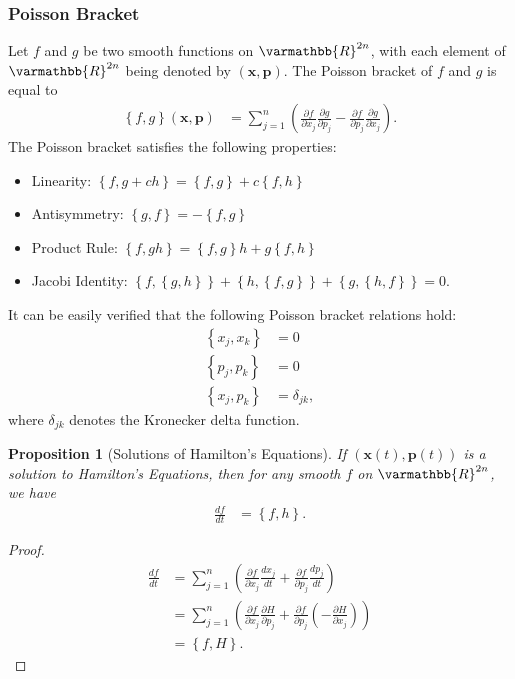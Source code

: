 \documentclass[12pt]{extarticle}
\newcommand{\R}{\varmathbb{R}}
\newcommand{\set}[1]{\left\{#1\right\}}
\theoremstyle{plain}
\newtheorem*{proposition}{Proposition}%
\theoremstyle{definition}
\theoremstyle{remark}
\begin{document}
  \subsubsection{Poisson Bracket}%
  Let $f$ and $g$ be two smooth functions on $\R^{2n}$, with each element of $\R^{2n}$ being denoted by $(\mathbf{x},\mathbf{p})$. The Poisson bracket of $f$ and $g$ is equal to
  \begin{align*}
    \set{f,g} (\mathbf{x},\mathbf{p}) &= \sum_{j=1}^{n}\left(\frac{\partial f}{\partial x_j}\frac{\partial g}{\partial p_j} - \frac{\partial f}{\partial p_j}\frac{\partial g}{\partial x_j}\right).
  \end{align*}
  The Poisson bracket satisfies the following properties:
  \begin{itemize}
    \item Linearity: $\set{f,g+ch} = \set{f,g} + c\set{f,h}$
    \item Antisymmetry: $\set{g,f} = -\set{f,g}$
    \item Product Rule: $\set{f,gh} = \set{f,g}h + g\set{f,h}$
    \item Jacobi Identity: $\set{f,\set{g,h}} + \set{h,\set{f,g}} + \set{g,\set{h,f}} = 0$.
  \end{itemize}
  It can be easily verified that the following Poisson bracket relations hold:
  \begin{align*}
    \set{x_j,x_k} &= 0\\
    \set{p_j,p_k} &= 0\\
    \set{x_j,p_k} &= \delta_{jk},
  \end{align*}
  where $\delta_{jk}$ denotes the Kronecker delta function.
  \begin{proposition}[Solutions of Hamilton's Equations]
    If $(\mathbf{x}(t),\mathbf{p}(t))$ is a solution to Hamilton's Equations, then for any smooth $f$ on $\R^{2n}$, we have
    \begin{align*}
      \frac{df}{dt} &= \set{f,h}.
    \end{align*}
  \end{proposition}
  \begin{proof}
    \begin{align*}
      \frac{df}{dt} &= \sum_{j=1}^{n}\left(\frac{\partial f}{\partial x_j}\frac{dx_j}{dt} + \frac{\partial f}{\partial p_j}\frac{dp_j}{dt}\right) \\
                    &= \sum_{j=1}^{n}\left(\frac{\partial f}{\partial x_j}\frac{\partial H}{\partial p_j}+ \frac{\partial f}{\partial p_j}\left(-\frac{\partial H}{\partial x_j}\right)\right)\\
                    &= \set{f,H}.
    \end{align*}
  \end{proof}
\end{document}
